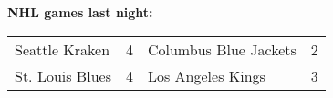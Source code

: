 \textbf{NHL games last night:}
\begin{tabular}{llll}
\toprule
 Seattle Kraken & 4 & Columbus Blue Jackets & 2 \\
St. Louis Blues & 4 &     Los Angeles Kings & 3 \\
\bottomrule
\end{tabular}
